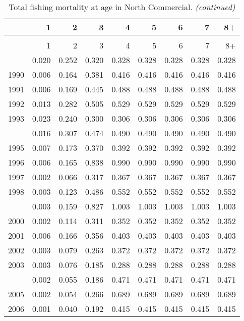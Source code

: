 \documentclass[
]{article}
\begin{document}
\begin{longtable}[t]{lrrrrrrrr}
\caption{\label{tab:North_Commercial-fleet-FAA-table}Total fishing mortality at age in North Commercial.}\\
\toprule
  & 1 & 2 & 3 & 4 & 5 & 6 & 7 & 8+\\
\midrule
\endfirsthead
\caption[]{Total fishing mortality at age in North Commercial. \textit{(continued)}}\\
\toprule
  & 1 & 2 & 3 & 4 & 5 & 6 & 7 & 8+\\
\midrule
\endhead

\endfoot
\bottomrule
\endlastfoot
1989 & 0.020 & 0.252 & 0.320 & 0.328 & 0.328 & 0.328 & 0.328 & 0.328\\
1990 & 0.006 & 0.164 & 0.381 & 0.416 & 0.416 & 0.416 & 0.416 & 0.416\\
1991 & 0.006 & 0.169 & 0.445 & 0.488 & 0.488 & 0.488 & 0.488 & 0.488\\
1992 & 0.013 & 0.282 & 0.505 & 0.529 & 0.529 & 0.529 & 0.529 & 0.529\\
1993 & 0.023 & 0.240 & 0.300 & 0.306 & 0.306 & 0.306 & 0.306 & 0.306\\
\addlinespace
1994 & 0.016 & 0.307 & 0.474 & 0.490 & 0.490 & 0.490 & 0.490 & 0.490\\
1995 & 0.007 & 0.173 & 0.370 & 0.392 & 0.392 & 0.392 & 0.392 & 0.392\\
1996 & 0.006 & 0.165 & 0.838 & 0.990 & 0.990 & 0.990 & 0.990 & 0.990\\
1997 & 0.002 & 0.066 & 0.317 & 0.367 & 0.367 & 0.367 & 0.367 & 0.367\\
1998 & 0.003 & 0.123 & 0.486 & 0.552 & 0.552 & 0.552 & 0.552 & 0.552\\
\addlinespace
1999 & 0.003 & 0.159 & 0.827 & 1.003 & 1.003 & 1.003 & 1.003 & 1.003\\
2000 & 0.002 & 0.114 & 0.311 & 0.352 & 0.352 & 0.352 & 0.352 & 0.352\\
2001 & 0.006 & 0.166 & 0.356 & 0.403 & 0.403 & 0.403 & 0.403 & 0.403\\
2002 & 0.003 & 0.079 & 0.263 & 0.372 & 0.372 & 0.372 & 0.372 & 0.372\\
2003 & 0.003 & 0.076 & 0.185 & 0.288 & 0.288 & 0.288 & 0.288 & 0.288\\
\addlinespace
2004 & 0.002 & 0.055 & 0.186 & 0.471 & 0.471 & 0.471 & 0.471 & 0.471\\
2005 & 0.002 & 0.054 & 0.266 & 0.689 & 0.689 & 0.689 & 0.689 & 0.689\\
2006 & 0.001 & 0.040 & 0.192 & 0.415 & 0.415 & 0.415 & 0.415 & 0.415\\

\end{longtable}
\end{document}

